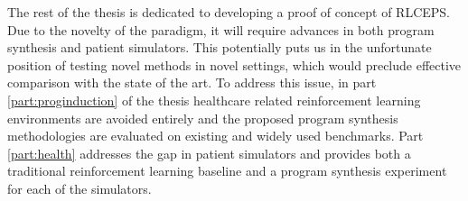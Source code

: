 The rest of the thesis is dedicated to developing a proof of concept of RLCEPS.
Due to the novelty of the paradigm, it will require advances in both program synthesis and patient simulators.
This potentially puts us in the unfortunate position of testing novel methods in novel settings, which would preclude effective comparison with the state of the art.
To address this issue, in part \ref{part:proginduction} of the thesis healthcare related reinforcement learning environments are avoided entirely and the proposed program synthesis methodologies are evaluated on existing and widely used benchmarks.
Part \ref{part:health} addresses the gap in patient simulators and provides both a traditional reinforcement learning baseline and a program synthesis experiment for each of the simulators.